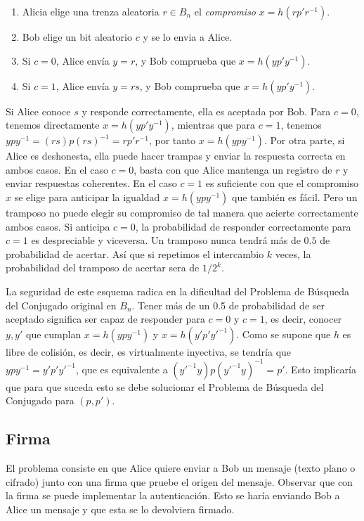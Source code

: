 \documentclass[12pt]{book}
\theoremstyle{definition}
\begin{document}
\begin{enumerate}
\item Alicia elige una trenza aleatoria $r\in B_n$ el \textit{compromiso} $x=h(rp'r^{-1})$.
\item Bob elige un bit aleatorio $c$ y se lo envia a Alice.
\item Si $c=0$, Alice envía $y=r$, y Bob comprueba que $x=h(yp'y^{-1})$.
\item Si $c=1$, Alice envía $y=rs$, y Bob comprueba que $x=h(yp'y^{-1})$.
\end{enumerate}

Si Alice conoce $s$ y responde correctamente, ella es aceptada por Bob. Para $c=0$, tenemos directamente $x=h(yp'y^{-1})$, mientras que para $c=1$, tenemos $ypy^{-1}=(rs)p(rs)^{-1}=rp'r^{-1}$, por tanto $x=h(ypy^{-1})$. Por otra parte, si Alice es deshonesta, ella puede hacer trampas y enviar la respuesta correcta en ambos casos. En el caso $c=0$, basta con que Alice mantenga un registro de $r$ y enviar respuestas coherentes. En el caso $c=1$ es suficiente con que el compromiso $x$ se elige para anticipar la igualdad $x=h(ypy^{-1})$ que también es fácil. Pero un tramposo no puede elegir su compromiso de tal manera que acierte correctamente ambos casos. Si anticipa $c=0$, la probabilidad de responder correctamente para $c=1$ es despreciable y viceversa. Un tramposo nunca tendrá más de $0.5$ de probabilidad de acertar. Así que si repetimos el intercambio $k$ veces, la probabilidad del tramposo de acertar sera de $1/2^k$.

La seguridad de este esquema radica en la dificultad del Problema de Búsqueda del Conjugado original en $B_n$. Tener más de un 0.5 de probabilidad de ser aceptado significa ser capaz de responder para $c=0$ y $c=1$, es decir, conocer $y,y'$ que cumplan $x=h(ypy^{-1})$ y $x=h(y'p'y'^{-1})$. Como se supone que $h$ es libre de colisión, es decir, es virtualmente inyectiva, se tendría que $ypy^{-1}=y'p'y'^{-1}$, que es equivalente a $(y'^{-1}y)p(y'^{-1}y)^{-1}=p'$. Esto implicaría que para que suceda esto se debe solucionar el Problema de Búsqueda del Conjugado para $(p,p')$.

\subsection{Firma}
El problema consiste en que Alice quiere enviar a Bob un mensaje (texto plano o cifrado) junto con una firma que pruebe el origen del mensaje. Observar que con la firma se puede implementar la autenticación. Esto se haría enviando Bob a Alice un mensaje y que esta se lo devolviera firmado.
\end{document}
